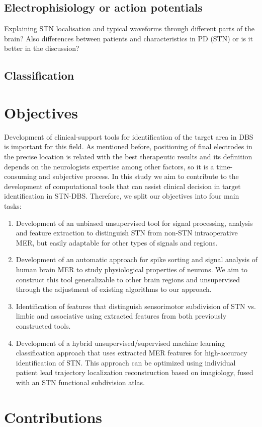 \subsection{Electrophisiology or action potentials}
\label{sec:electroph}
Explaining STN localisation and typical waveforms through different parts of the brain?
Also differences between patients and characteristics in PD (STN) or is it better in the discussion?

\subsection{Classification}

\section{Objectives}
\label{sec:objectives}
Development of clinical-support tools for identification of the target area in DBS is important for this field. As mentioned before, positioning of final electrodes in the precise location is related with the best therapeutic results and its definition depends on the neurologists expertise among other factors, so it is a time-consuming and subjective process. In this study we aim to contribute to the development of computational tools that can assist clinical decision in target identification in STN-DBS. Therefore, we split our objectives into four main tasks:

\begin{enumerate}
\item Development of an unbiased unsupervised tool for signal processing, analysis and feature extraction to distinguish STN from non-STN intraoperative MER, but easily adaptable for other types of signals and regions.

\item Development of an automatic approach for spike sorting and signal analysis of human brain MER to study physiological properties of neurons. We aim to construct this tool generalizable to other brain regions and unsupervised through the adjustment of existing algorithms to our approach.

\item Identification of features that distinguish sensorimotor subdivision of STN vs. limbic and associative using extracted features from both previously constructed tools.

\item Development of a hybrid unsupervised/supervised machine learning classification approach that uses extracted MER features for high-accuracy identification of STN. This approach can be optimized using individual patient lead trajectory localization reconstruction based on imagiology, fused with an STN functional subdivision atlas.
\end{enumerate}

\section{Contributions}